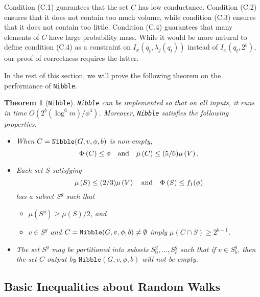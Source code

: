 \documentclass[11pt]{article}
\newtheorem{theorem}{Theorem}[section]
\newcommand{\lamj}[2]{\lambda_{#1} (#2)}
\def\conduc#1#2{\Phi_{#1}\left(#2  \right)}
\def\vol#1{\mu \left(#1  \right)}
\begin{document}
Condition (C.1) guarantees that the set $C$ has low conductance.
Condition (C.2) ensures that it does not contain too much volume,
  while condition (C.3) ensures that it does not contain too little.
Condition (C.4) guarantees that many elements of $C$
  have large probability mass.
While it would be more natural to define condition (C.4) as a constraint
  on $I_{x} (q_{t}, \lamj{j}{q_{t}})$ instead of
  $I_{x} (q_{t}, 2^{b})$, our proof of correctness requires the latter.


In the rest of this section, we will
  prove the following theorem on the performance of \texttt{Nibble}.

\begin{theorem}[\texttt{Nibble}]\label{thm:Nibble}
\mbox{\rm \texttt{Nibble}}
  can be implemented so that
  on all inputs, it runs in time
  $  O (2^{b} (\log^{6} m ) / \phi^{4})$.
Moreover, \mbox{\rm \texttt{Nibble}} satisfies the following properties.
\begin{itemize}
\item [\mbox{\rm (N.1)}]
When
$C =\mbox{\rm \texttt{Nibble}} (G, v,\phi, b)$ is non-empty,
\[
\conduc{}{C} \leq \phi \quad  \mbox{\rm and}\quad  \vol{C} \leq (5/6)\vol{V}.
\]
\item [\mbox{\rm (N.2)}]
  Each set $S$ satisfying
\[
\vol{S} \leq (2/3) \vol{V} \quad \mbox{\rm and} \quad   \conduc{}{S} \leq f_{1} (\phi )
\]
has a subset $S^{g}$ such that
\begin{itemize}
\item [\mbox{\rm (N.2.a)}] $\vol{S^{g}} \geq \vol{S}/2$, and

\item [\mbox{\rm (N.2.b)}]  $v \in S^{g}$ and
  $C =\mbox{\rm \texttt{Nibble}} (G, v,\phi, b) \not = \emptyset$ imply
  $\vol{C \cap S} \geq 2^{b-1}$.
\end{itemize}
\item [\mbox{\rm (N.3)}] The set $S^{g}$ may be partitioned into
  subsets $S^{g}_{0}, \dotsc , S^{g}_{\ell}$
  such that if $v \in S^{g}_{b}$, then the
  set $C$ output by $\mathtt{Nibble} (G, v, \phi,b)$
  will not be empty.
\end{itemize}
\end{theorem}



\subsection{Basic Inequalities about Random Walks}
\end{document}

